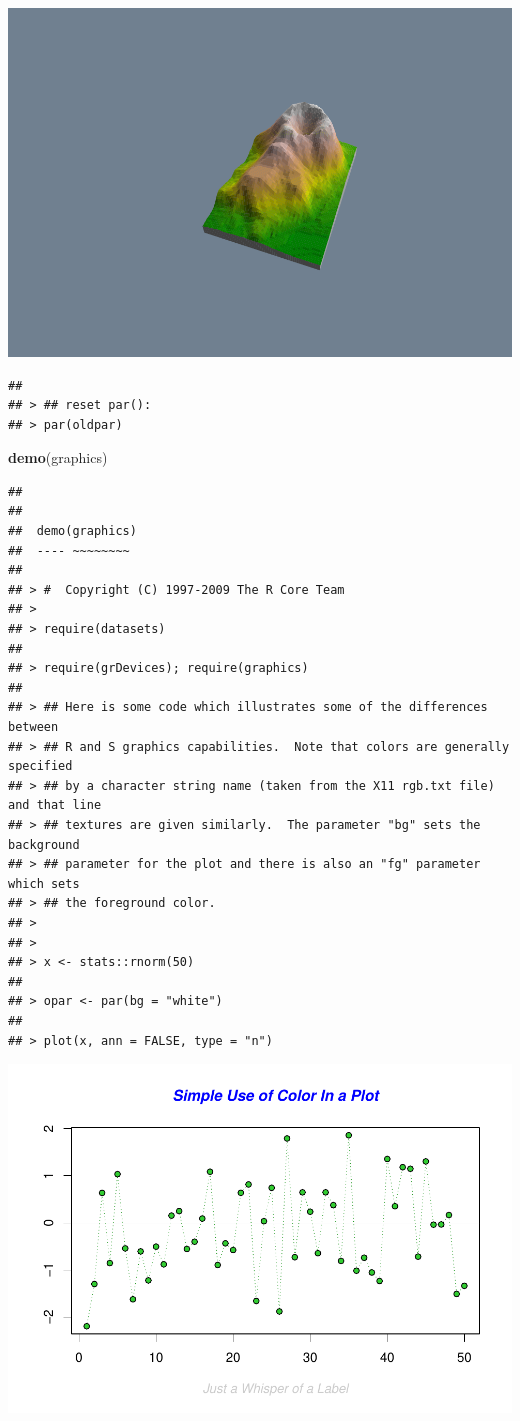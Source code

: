 \documentclass[
]{book}
\newenvironment{Shaded}{\begin{snugshade}}{\end{snugshade}}
\newcommand{\KeywordTok}[1]{\textcolor[rgb]{0.13,0.29,0.53}{\textbf{#1}}}
\newcommand{\NormalTok}[1]{#1}
\begin{document}
\includegraphics{TudodoR_files/figure-latex/unnamed-chunk-146-8.pdf}

\begin{verbatim}
## 
## > ## reset par():
## > par(oldpar)
\end{verbatim}

\begin{Shaded}
\begin{Highlighting}[]
\KeywordTok{demo}\NormalTok{(graphics)}
\end{Highlighting}
\end{Shaded}

\begin{verbatim}
## 
## 
##  demo(graphics)
##  ---- ~~~~~~~~
## 
## > #  Copyright (C) 1997-2009 The R Core Team
## > 
## > require(datasets)
## 
## > require(grDevices); require(graphics)
## 
## > ## Here is some code which illustrates some of the differences between
## > ## R and S graphics capabilities.  Note that colors are generally specified
## > ## by a character string name (taken from the X11 rgb.txt file) and that line
## > ## textures are given similarly.  The parameter "bg" sets the background
## > ## parameter for the plot and there is also an "fg" parameter which sets
## > ## the foreground color.
## > 
## > 
## > x <- stats::rnorm(50)
## 
## > opar <- par(bg = "white")
## 
## > plot(x, ann = FALSE, type = "n")
\end{verbatim}

\includegraphics{TudodoR_files/figure-latex/unnamed-chunk-147-1.pdf}
\end{document}
